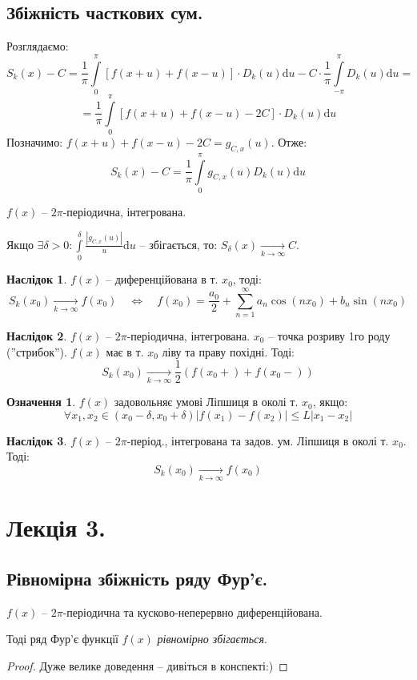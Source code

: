 \documentclass[a4paper]{scrartcl}
\theoremstyle{definition}
\newtheorem*{defo}{Означення}
\theoremstyle{remark}
\theoremstyle{definition}
\newtheorem*{consequence}{Наслідок}
\theoremstyle{definition}
\begin{document}
\subsection{Збіжність часткових сум.}
Розглядаємо:
$$
S_k(x) - C = \frac{1}{\pi}  \int\limits_{0}^{\pi}{ \left[ f(x+u) + f(x-u) \right]\cdot D_k(u) \mathrm{d} u } - C \cdot \frac{1}{\pi}  \int\limits_{-\pi}^{\pi}{D_k(u)\mathrm{d} u} =
$$
$$
= \frac{1}{\pi}  \int\limits_{0}^{\pi}{ \left[ f(x+u) + f(x-u) - 2C \right]\cdot D_k(u) \mathrm{d} u }
$$
Позначимо: $f(x+u) + f(x-u) - 2C  = g_{C, x}(u)$. Отже:
$$
S_k(x) - C = \frac{1}{\pi}  \int\limits_{0}^{\pi}{
g_{C, x}(u) D_k(u) \mathrm{d} u
}
$$
\begin{boxteo}
$
f(x)
$ -- $2\pi$-періодична, інтегрована.\par
Якщо $\exists \delta >0 :  \int\limits_{0}^{\delta}{
\frac{ \left| g_{C,x} (u) \right|}{u} \mathrm{d} u
} $ -- збігається, то:
$
S_{\delta}(x) \xrightarrow[k\to\infty]{}C
$.
\end{boxteo}
\begin{consequence}
  $f(x)$ -- диференційована в т. $x_0$, тоді:
  $$
  S_k(x_0) \xrightarrow[k\to \infty]{} f(x_0) \quad \Longleftrightarrow \quad f(x_0) = \frac{a_0}{2} +  \sum\limits_{n = 1}^{ \infty}{
  a_n \cos{(nx_0)} + b_n \sin{(nx_0)}
  }
  $$
\end{consequence}
\begin{consequence}
$
f(x)
$ -- $2\pi$-періодична, інтегрована. $x_0$ -- точка розриву 1го роду (''стрибок''). $f(x)$ має в т. $x_0$ ліву та праву похідні. Тоді:
$$
S_k (x_0) \xrightarrow[k\to \infty]{} \frac{1}{2}  \left( f(x_0+) + f(x_0-) \right)
$$
\end{consequence}
\begin{defo}
 $f(x)$ задовольняє умові Ліпшиця в околі т. $x_0$, якщо:
 $$
 \forall x_1, x_2 \in (x_0 - \delta, x_0 + \delta) \left| f(x_1) - f(x_2) \right| \leq L \left| x_1 - x_2 \right|
 $$
\end{defo}
\begin{consequence}
$
f(x)
$ -- $2\pi$-період., інтегрована та задов. ум. Ліпшиця в околі т. $x_0$. Тоді:
$$
S_k (x_0) \xrightarrow[k\to \infty]{} f(x_0)
$$
\end{consequence}
\newpage
\section{Лекція 3.}
\subsection{Рівномірна збіжність ряду Фур'є.}
\begin{boxteo}
$
f(x)
$ -- $2\pi$-періодична та кусково-неперервно диференційована.\par
Тоді ряд Фур'є функції $f(x)$ \textit{рівномірно збігається}.
\end{boxteo}
\begin{proof}
 Дуже велике доведення -- дивіться в конспекті:)
\end{proof}
\end{document}
